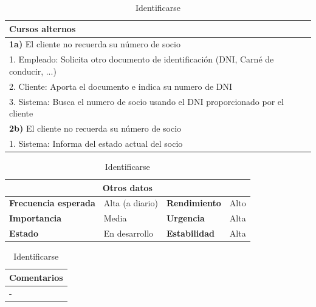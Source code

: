 \documentclass[12pt,spanish]{article}
\begin{document}
\begin{table}[H]
\vspace{1cm}

\begin{tabular}{|m{10pt}|m{7.15cm}|m{10pt}|m{7.15cm}|}
\hline
\multicolumn{4}{|m{16.2cm}|}{\textbf{Cursos alternos}} \\
\hline
\multicolumn{4}{|m{16.2cm}|}{\textbf{1a)} El cliente no recuerda su número de socio} \\
\hline
\multicolumn{4}{|m{16.2cm}|}{1. Empleado: Solicita otro documento de identificación (DNI, Carné de conducir, ...)}\\
\multicolumn{4}{|m{16.2cm}|}{2. Cliente: Aporta el documento e indica su numero de DNI}\\
\multicolumn{4}{|m{16.2cm}|}{3. Sistema: Busca el numero de socio usando el DNI proporcionado por el cliente}\\	
\hline
\multicolumn{4}{|m{16.2cm}|}{\textbf{2b)} El cliente no recuerda su número de socio} \\
\hline	
\multicolumn{4}{|m{16.2cm}|}{1. Sistema: Informa del estado actual del socio}\\	
\hline
\end{tabular}

\vspace{1cm}

\begin{tabular}{|m{3.72cm}|m{3.72cm}|m{3.72cm}|m{3.72cm}|}
\hline
\multicolumn{4}{|c|}{\textbf{Otros datos}} \\
\hline
\textbf{Frecuencia esperada} & Alta (a diario) & \textbf{Rendimiento} & Alto \\
\hline
\textbf{Importancia} & Media & \textbf{Urgencia} & Alta \\
\hline
\textbf{Estado} & En desarrollo & \textbf{Estabilidad} & Alta \\
\hline
\end{tabular}

\vspace{1cm}

\begin{tabular}{|m{16.2cm}|}
\hline
\textbf{Comentarios} \\
\hline
- \\
\hline
\end{tabular}

\caption{Identificarse}

\end{table}


\end{document}
